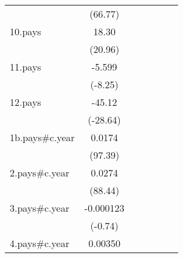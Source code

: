 {\begin{tabular}{l*{6}{c}}
                    &     (66.77)         &                     &                     &                     &                     &                     \\
[1em]
10.pays             &       18.30\sym{***}&                     &                     &                     &                     &                     \\
                    &     (20.96)         &                     &                     &                     &                     &                     \\
[1em]
11.pays             &      -5.599\sym{***}&                     &                     &                     &                     &                     \\
                    &     (-8.25)         &                     &                     &                     &                     &                     \\
[1em]
12.pays             &      -45.12\sym{***}&                     &                     &                     &                     &                     \\
                    &    (-28.64)         &                     &                     &                     &                     &                     \\
[1em]
1b.pays#c.year      &      0.0174\sym{***}&                     &                     &                     &                     &                     \\
                    &     (97.39)         &                     &                     &                     &                     &                     \\
[1em]
2.pays#c.year       &      0.0274\sym{***}&                     &                     &                     &                     &                     \\
                    &     (88.44)         &                     &                     &                     &                     &                     \\
[1em]
3.pays#c.year       &   -0.000123         &                     &                     &                     &                     &                     \\
                    &     (-0.74)         &                     &                     &                     &                     &                     \\
[1em]
4.pays#c.year       &     0.00350\sym{***}&                     &                     &                     &                     &                     \\

\end{tabular}}
